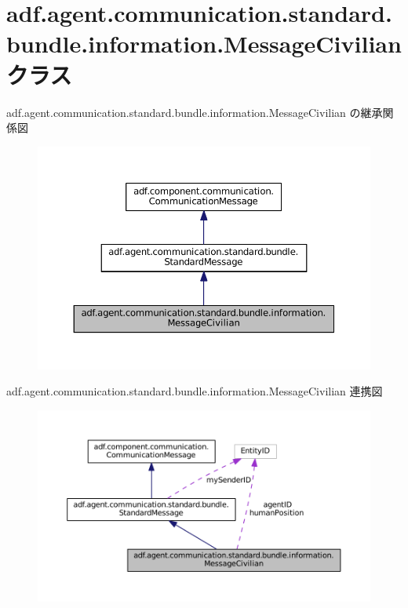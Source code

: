 \hypertarget{classadf_1_1agent_1_1communication_1_1standard_1_1bundle_1_1information_1_1MessageCivilian}{}\section{adf.\+agent.\+communication.\+standard.\+bundle.\+information.\+Message\+Civilian クラス}
\label{classadf_1_1agent_1_1communication_1_1standard_1_1bundle_1_1information_1_1MessageCivilian}


adf.\+agent.\+communication.\+standard.\+bundle.\+information.\+Message\+Civilian の継承関係図
\nopagebreak
\begin{figure}[H]
\begin{center}
\leavevmode
\includegraphics[width=350pt]{classadf_1_1agent_1_1communication_1_1standard_1_1bundle_1_1information_1_1MessageCivilian__inherit__graph}
\end{center}
\end{figure}


adf.\+agent.\+communication.\+standard.\+bundle.\+information.\+Message\+Civilian 連携図
\nopagebreak
\begin{figure}[H]
\begin{center}
\leavevmode
\includegraphics[width=350pt]{classadf_1_1agent_1_1communication_1_1standard_1_1bundle_1_1information_1_1MessageCivilian__coll__graph}
\end{center}
\end{figure}
